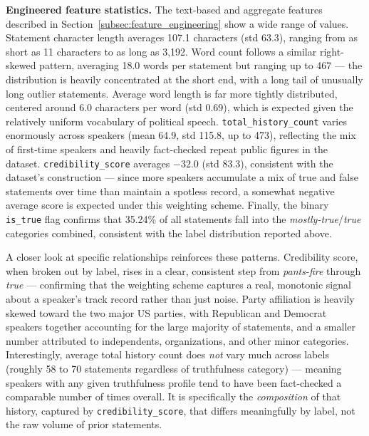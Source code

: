 \documentclass[a4paper,fleqn]{cas-sc}
\begin{document}
\textbf{Engineered feature statistics.} The text-based and aggregate features described in Section~\ref{subsec:feature_engineering} show a wide range of values. Statement character length averages 107.1 characters (std 63.3), ranging from as short as 11 characters to as long as 3,192. Word count follows a similar right-skewed pattern, averaging 18.0 words per statement but ranging up to 467 — the distribution is heavily concentrated at the short end, with a long tail of unusually long outlier statements. Average word length is far more tightly distributed, centered around 6.0 characters per word (std 0.69), which is expected given the relatively uniform vocabulary of political speech. \texttt{total\_history\_count} varies enormously across speakers (mean 64.9, std 115.8, up to 473), reflecting the mix of first-time speakers and heavily fact-checked repeat public figures in the dataset. \texttt{credibility\_score} averages $-32.0$ (std 83.3), consistent with the dataset's construction — since more speakers accumulate a mix of true and false statements over time than maintain a spotless record, a somewhat negative average score is expected under this weighting scheme. Finally, the binary \texttt{is\_true} flag confirms that 35.24\% of all statements fall into the \textit{mostly-true}/\textit{true} categories combined, consistent with the label distribution reported above.

A closer look at specific relationships reinforces these patterns. Credibility score, when broken out by label, rises in a clear, consistent step from \textit{pants-fire} through \textit{true} — confirming that the weighting scheme captures a real, monotonic signal about a speaker's track record rather than just noise. Party affiliation is heavily skewed toward the two major US parties, with Republican and Democrat speakers together accounting for the large majority of statements, and a smaller number attributed to independents, organizations, and other minor categories. Interestingly, average total history count does \emph{not} vary much across labels (roughly 58 to 70 statements regardless of truthfulness category) — meaning speakers with any given truthfulness profile tend to have been fact-checked a comparable number of times overall. It is specifically the \emph{composition} of that history, captured by \texttt{credibility\_score}, that differs meaningfully by label, not the raw volume of prior statements.
\end{document}
